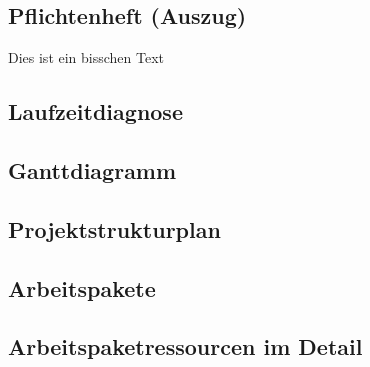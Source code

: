 \documentclass[11pt,toc=sectionentrywithoutdots, 
headheight=44pt, headings=optiontoheadandtoc, hyperfootnotes=false, hypertexnames=false]{scrartcl}
\begin{document}

\subsection{Pflichtenheft (Auszug)}
Dies ist ein bisschen Text

\subsection{Laufzeitdiagnose}
\blindtext

\subsection{Ganttdiagramm}
\blindtext

\subsection{Projektstrukturplan}
\blindtext

\subsection{Arbeitspakete}
\blindtext

\subsection{Arbeitspaketressourcen im Detail}
\blindtext
\end{document}
